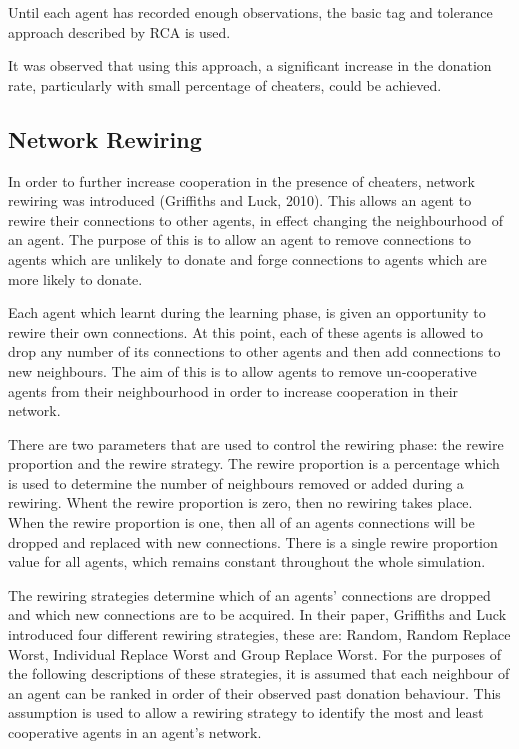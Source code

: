 Until each agent has recorded enough observations,
the basic tag and tolerance approach described by RCA is used.

It was observed that using this approach,
a significant increase in the donation rate, particularly
with small percentage of cheaters, could be achieved.

\subsection{Network Rewiring}

In order to further increase cooperation
in the presence of cheaters, network rewiring was introduced (Griffiths and Luck, 2010).
This allows an agent to rewire their connections to other agents,
in effect changing the neighbourhood of an agent.
The purpose of this is to allow an agent to remove connections
to agents which are unlikely to donate and forge connections to agents
which are more likely to donate.

Each agent which learnt during the learning phase,
is given an opportunity to rewire their own connections.
At this point, each of these agents is allowed to drop any number of its
connections to other agents and then add connections to new neighbours.
The aim of this is to allow agents to remove un-cooperative agents from
their neighbourhood in order to increase cooperation in their network.

There are two parameters that are used to control the rewiring phase:
the rewire proportion and the rewire strategy.
The rewire proportion is a percentage which is used to determine the number of
neighbours removed or added during a rewiring.
Whent the rewire proportion is zero, then no rewiring takes place.
When the rewire proportion is one, then all of an agents connections will be dropped and replaced with new connections.
There is a single rewire proportion value for all agents, which remains constant throughout the whole simulation.

The rewiring strategies determine which of an agents' connections are dropped and which new connections are to be acquired.
In their paper, Griffiths and Luck introduced four different rewiring strategies,
these are: Random, Random Replace Worst, Individual Replace Worst and Group Replace Worst.
For the purposes of the following descriptions of these strategies,
it is assumed that each neighbour of an agent can be ranked in order of their observed past donation behaviour.
This assumption is used to allow a rewiring strategy to identify the most and least cooperative agents in an agent's network.

